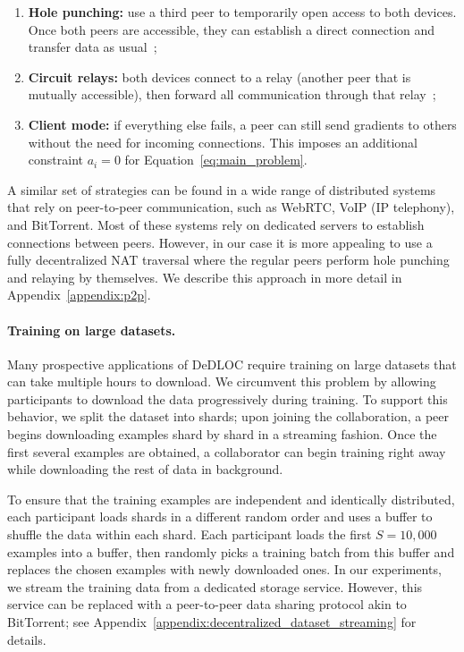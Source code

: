 \vspace{-4pt}
\begin{enumerate}[leftmargin=*]
    \item \textbf{Hole punching:} use a third peer to temporarily open access to both devices. Once both peers are accessible, they can establish a direct connection and transfer data as usual~\cite{hole_punching};
    \item \textbf{Circuit relays:} both devices connect to a relay (another peer that is mutually accessible), then forward all communication through that relay~\cite{TURN};
    \item \textbf{Client mode:} if everything else fails, a peer can still send gradients to others without the need for incoming connections. This imposes an additional constraint $a_i=0$ for Equation~\eqref{eq:main_problem}.
\end{enumerate}
\vspace{-4pt}

A similar set of strategies can be found in a wide range of distributed systems that rely on peer-to-peer communication, such as WebRTC, VoIP (IP telephony), and BitTorrent. Most of these systems rely on dedicated servers to establish connections between peers. However, in our case it is more appealing to use a fully decentralized NAT traversal where the regular peers perform hole punching and relaying by themselves. We describe this approach in more detail in Appendix~\ref{appendix:p2p}.

\vspace{-4pt}
\paragraph{Training on large datasets.} Many prospective applications of DeDLOC require training on large datasets that can take multiple hours to download. We circumvent this problem by allowing participants to download the data progressively during training. To support this behavior, we split the dataset into shards; upon joining the collaboration, a peer begins downloading examples shard by shard in a streaming fashion. Once the first several examples are obtained, a collaborator can begin training right away while downloading the rest of data in background.

To ensure that the training examples are independent and identically distributed, each participant loads shards in a different random order and uses a buffer to shuffle the data within each shard. Each participant loads the first $S=10,000$ examples into a buffer, then randomly picks a training batch from this buffer and replaces the chosen examples with newly downloaded ones. In our experiments, we stream the training data from a dedicated storage service. However, this service can be replaced with a peer-to-peer data sharing protocol akin to BitTorrent; see Appendix~\ref{appendix:decentralized_dataset_streaming} for details.



